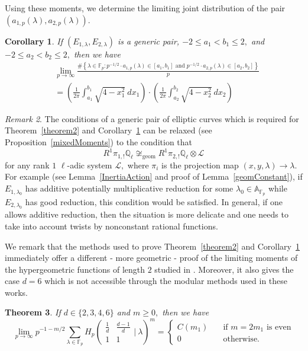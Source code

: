 \documentclass[12pt]{amsart}
\newtheorem{theorem}{Theorem}[section]
\newtheorem{corollary}[theorem]{Corollary}
\theoremstyle{definition}
\theoremstyle{remark}
\newtheorem{remark}[theorem]{Remark}
\numberwithin{equation}{section}
\def\A{\mathbb A}
\def\F{{\mathbb F}}
\def\Q{{\mathbb Q}}
\def\Q{\mathbb{Q}}
\def\F{\mathbb{F}}
\begin{document}
Using these moments, we determine the limiting joint distribution of the pair $(a_{1,p}(\lambda),a_{2,p}(\lambda)).$

\begin{corollary}\label{corollary2}
    If $(E_{1,\lambda},E_{2,\lambda})$ is a generic pair, $-2\leq a_1<b_1\leq 2,$ and $-2\leq a_2<b_2\leq 2,$ then we have
    \begin{align*}
    &\lim\limits_{p\to\infty}\frac{\#\left\{\lambda\in\F_p: p^{-1/2}\cdot a_{1,p}(\lambda)\in[a_1,b_1]\text{ and }p^{-1/2}\cdot a_{2,p}(\lambda)\in[a_2,b_2]\right\}}{p} \\
    & = \left(\frac{1}{2\pi} \int_{a_1}^{b_1} \sqrt{4-x_1^2}\ dx_1\right) \cdot \left(\frac{1}{2\pi} \int_{a_2}^{b_2} \sqrt{4-x_2^2}\ dx_2\right)
    \end{align*}
\end{corollary}

\begin{remark}
The conditions of a generic pair of elliptic curves which is required for Theorem~\ref{theorem2} and Corollary~\ref{corollary2} can be relaxed (see Proposition~\ref{mixedMoments}) to the condition that
    $$
    R^1\pi_{1,!}\Q_\ell\not\cong_{\text{geom}} R^1\pi_{2,!}\Q_\ell\otimes\mathcal{L}
    $$
    for any rank $1$ $\ell$-adic system $\mathcal{L},$ where $\pi_{i}$ is the projection map $(x,y,\lambda)\to \lambda.$ For example (see Lemma~\ref{InertiaAction} and proof of Lemma~\ref{geomConstant}), if $E_{1,\lambda_0}$ has additive potentially multiplicative reduction for some $\lambda_0\in\A_{\F_p}$ while $E_{2,\lambda_0}$ has good reduction, this condition would be satisfied. In general, if one allows additive reduction, then the situation is more delicate and one needs to take into account twists by nonconstant rational functions.
\end{remark}

We remark that the methods used to prove Theorem~\ref{theorem2} and Corollary~\ref{corollary2} immediately offer a different - more geometric - proof of the limiting moments of the hypergeometric functions of length $2$ studied in \cite{HGFDistributionOnoSaikia,ono2024distributionhessianvaluesgaussian,grove2024hypergeometricmomentshecketrace}. Moreover, it also gives the case $d=6$ which is not accessible through the modular methods used in these works.

\begin{theorem}\label{theorem3}
    If $d\in\{2,3,4,6\}$ and $ m\geq 0,$ then we have
    $$
    \lim\limits_{p\to\infty}p^{-1-m/2}\sum\limits_{\lambda\in\F_p}H_p\left(\begin{array}{cc}
    \frac{1}{d} & \frac{d-1}{d}  \\
     1 & 1
\end{array}\bigg|\ \lambda\right)^m= \begin{cases}
    C(m_1) &\ \ \ \text{ if }m=2m_1\text{ is even} \\
    0 &\ \ \ \text{ otherwise.}
\end{cases}
    $$
\end{theorem}
\end{document}
